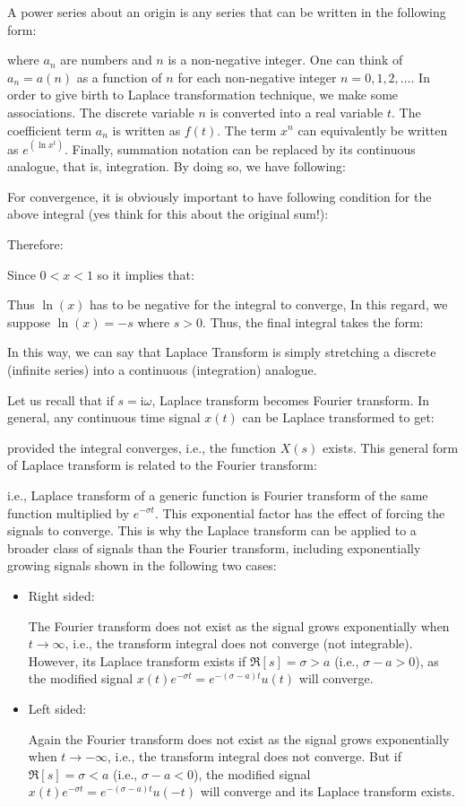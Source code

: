 	A power series about an origin is any series that can be written in the following form:
	
	where $a_n$ are  numbers and $n$ is a non-negative integer. One can think of $a_n = a(n)$ as a function of $n$ for each non-negative integer $n = 0, 1, 2, \ldots$. In order to give birth to Laplace transformation technique, we  make some associations. The discrete variable $n$ is converted into a real variable $t$. The coefficient term $a_n$ is written as $f(t)$. The term $x^n$ can equivalently be written as $e^{(\ln x^t)}$. Finally, summation notation can be replaced by its continuous analogue, that is, integration. By doing so, we have following:
	 
For convergence, it is obviously important to have following condition for the above integral (yes think for this about the original sum!):
	 
	Therefore:
	 
	Since $0<x<1 $ so it implies that:
	
	Thus $\ln(x)$ has to be negative for the integral to converge, In this regard, we suppose $\ln(x)=-s$ where $s>0$. Thus, the final integral takes the form:
	
	In this way, we can say that Laplace Transform is simply  stretching a discrete (infinite series)  into a continuous (integration) analogue. 
	
	Let us recall that if $s=\mathrm{i}\omega$, Laplace transform becomes Fourier transform. In general, any continuous time signal $x(t)$ can be Laplace transformed to get:

provided the integral converges, i.e., the function $X(s)$ exists. This general form of Laplace transform is related to the Fourier transform:

i.e., Laplace transform of a generic function is Fourier transform of the same function multiplied by $e^{-\sigma t}$. This exponential factor has the effect of forcing the signals to converge. This is why the Laplace transform can be applied to a broader class of signals than the Fourier transform, including exponentially growing signals shown in the following two cases:

\begin{itemize}
	\item Right sided:
	
	The Fourier transform does not exist as the signal grows exponentially when $t\rightarrow \infty$, i.e., the transform integral does not converge (not integrable). However, its Laplace transform exists if $\Re[s]=\sigma>a$ (i.e., $\sigma-a>0$), as the modified signal $x(t)e^{-\sigma t}=e^{-(\sigma-a)t}u(t)$ will converge.
	
	\item Left sided:
	 
	Again the Fourier transform does not exist as the signal grows exponentially
	when $t\rightarrow -\infty$, i.e., the transform integral does not converge.
	But if $\Re[s]=\sigma<a$ (i.e., $\sigma-a<0$), the modified signal
	$x(t)e^{-\sigma t}=e^{-(\sigma-a)t}u(-t)$ will converge and its Laplace 
	transform exists.
\end{itemize}

